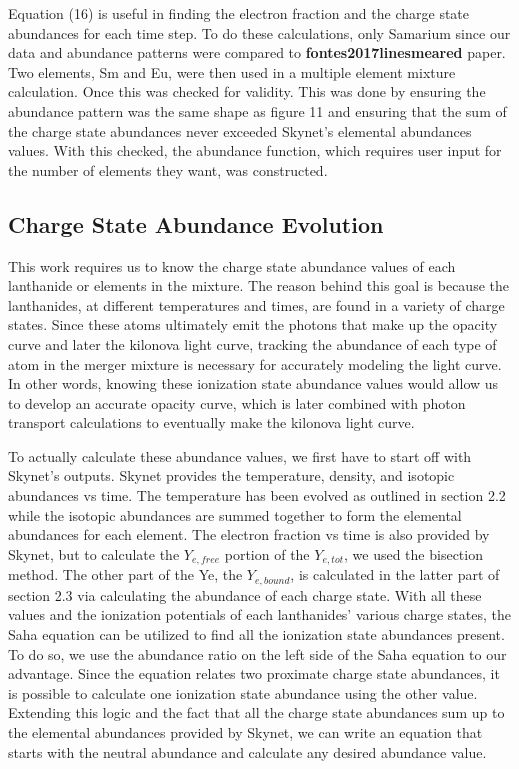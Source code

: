 \documentclass[11pt,a4paper]{article}
\begin{document}
Equation (16) is useful in finding the electron fraction and the charge state abundances for each time step. To do these calculations, only Samarium since our data and abundance patterns were compared to \textbf{fontes2017linesmeared} paper. Two elements, Sm and Eu, were then used in a multiple element mixture calculation. Once this was checked for validity. This was done by ensuring the abundance pattern was the same shape as figure 11 and ensuring that the sum of the charge state abundances never exceeded Skynet's elemental abundances values. With this checked, the abundance function, which requires user input for the number of elements they want, was constructed. 


\subsection{Charge State Abundance Evolution}

\hspace{8mm} This work requires us to know the charge state abundance values of each lanthanide or elements in the mixture. The reason behind this goal is because the lanthanides, at different temperatures and times, are found in a variety of charge states. Since these atoms ultimately emit the photons that make up the opacity curve and later the kilonova light curve, tracking the abundance of each type of atom in the merger mixture is necessary for accurately modeling the light curve. In other words, knowing these ionization state abundance values would allow us to develop an accurate opacity curve, which is later combined with photon transport calculations to eventually make the kilonova light curve.

To actually calculate these abundance values, we first have to start off with Skynet's outputs. Skynet provides the temperature, density, and isotopic abundances vs time. The temperature has been evolved as outlined in section 2.2 while the isotopic abundances are summed together to form the elemental abundances for each element. The electron fraction vs time is also provided by Skynet, but to calculate the $Y_{e,free}$ portion of the $Y_{e,tot}$, we used the bisection method. The other part of the Ye, the $Y_{e,bound}$, is calculated in the latter part of section 2.3 via calculating the abundance of each charge state. With all these values and the ionization potentials of each lanthanides' various charge states, the Saha equation can be utilized to find all the ionization state abundances present. To do so, we use the abundance ratio on the left side of the Saha equation to our advantage. Since the equation relates two proximate charge state abundances, it is possible to calculate one ionization state abundance using the other value. Extending this logic and the fact that all the charge state abundances sum up to the elemental abundances provided by Skynet, we can write an equation that starts with the neutral abundance and calculate any desired abundance value. 
\end{document}
